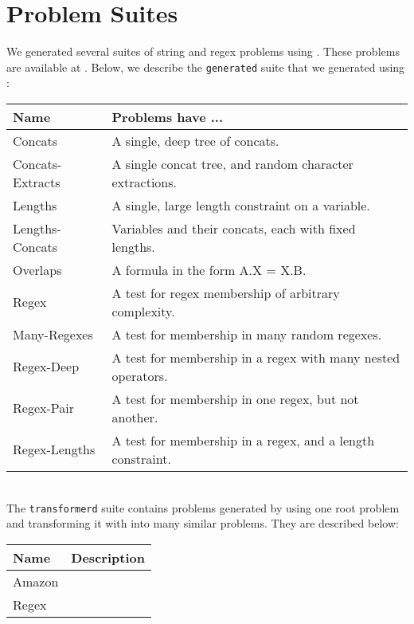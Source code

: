 \section{Problem Suites}
\label{sec:problems}

    We generated several suites of string and regex problems using \fuzzer{}. These problems are available at \problemRepo{}. Below, we describe the \texttt{generated} suite that we generated using \generator{}: \\

    \begin{tabular}{|l|l|}
        \hline
        \textbf{Name}    & \textbf{Problems have ...} \\ \hline
        Concats          & A single, deep tree of concats. \\ \hline
        Concats-Extracts & A single concat tree, and random character extractions. \\ \hline
        Lengths          & A single, large length constraint on a variable. \\ \hline
        Lengths-Concats  & Variables and their concats, each with fixed lengths. \\ \hline
        Overlaps         & A formula in the form A.X = X.B. \\ \hline
        Regex            & A test for regex membership of arbitrary complexity. \\ \hline
        Many-Regexes     & A test for membership in many random regexes. \\ \hline
        Regex-Deep       & A test for membership in a regex with many nested operators. \\ \hline
        Regex-Pair       & A test for membership in one regex, but not another. \\ \hline
        Regex-Lengths    & A test for membership in a regex, and a length constraint. \\ \hline
    \end{tabular}
    \hfill \\

    The \texttt{transformerd} suite contains problems generated by using one root problem and transforming it with \transformer{} into many similar problems. They are described below:


    \begin{tabular}{|l|l|}
        \hline
        \textbf{Name} & \textbf{Description} \\ \hline
        Amazon        & \\ \hline
        Regex         & \\ \hline
    \end{tabular}

